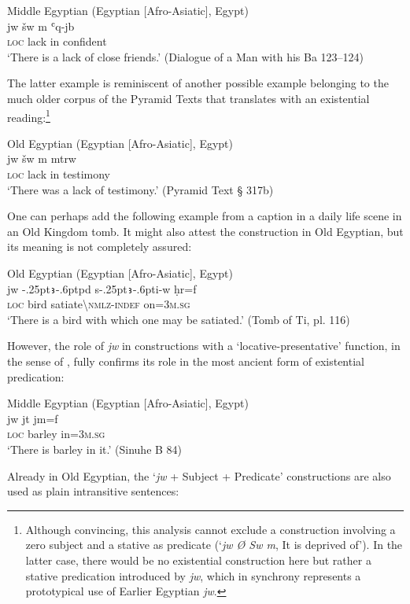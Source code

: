 \documentclass[output=paper]{langsci/langscibook}
\newcommand{\ꜥ}{ʿ}
\newcommand{\ꜣ}{\kern-.25pt\texttt{ꜣ}\kern-.6pt}
\begin{document}
\ea Middle Egyptian (Egyptian [Afro-Asiatic], Egypt) \label{ex:AE15}\\
	\gll jw šw m {\ꜥ}q-jb\\
	\textsc{loc} lack in confident\\
	\glt ‘There is a lack of close friends.’ (Dialogue of a Man with his Ba 123–124)
\z 

The latter example is reminiscent of another possible example belonging to the much older corpus of the Pyramid Texts that \citet[333]{Allen2017} translates with an existential reading:\footnote{Although convincing, this analysis cannot exclude a construction involving a zero subject and a stative as predicate (‘\textit{jw Ø Sw m}, It is deprived of’). In the latter case, there would be no existential construction here but rather a stative predication introduced by \textit{jw}, which in synchrony represents a prototypical use of Earlier Egyptian \textit{jw}.}

\ea Old Egyptian (Egyptian [Afro-Asiatic], Egypt) \label{ex:AE16}\\
	\gll jw šw m mtrw\\
	\textsc{loc} lack in testimony\\
	\glt ‘There was a lack of testimony.’ (Pyramid Text § 317b)
\z 

One can perhaps add the following example from a caption in a daily life scene in an Old Kingdom tomb. It might also attest the construction in Old Egyptian, but its meaning is not completely assured:

\ea Old Egyptian (Egyptian [Afro-Asiatic], Egypt) \label{ex:AE17}\\
	\gll jw {\ꜣ}pd s{\ꜣ}i-w ḥr=f\\
	\textsc{loc} bird satiate\textbackslash\textsc{nmlz-indef} on=\textsc{3m.sg}\\
	\glt ‘There is a bird with which one may be satiated.’ (Tomb of Ti, pl. 116)
\z 

However, the role of \textit{jw} in constructions with a ‘locative-presentative’ function, in the sense of \citet{Hengeveld1992}, fully confirms its role in the most ancient form of existential predication:

\ea Middle Egyptian (Egyptian [Afro-Asiatic], Egypt) \label{ex:AE18}\\
	\gll jw jt jm=f\\
	\textsc{loc} barley in=\textsc{3m.sg}\\
	\glt ‘There is barley in it.’ (Sinuhe B 84)
\z 

Already in Old Egyptian, the ‘\textit{jw} + Subject + Predicate’ constructions are also used as plain intransitive sentences: 
\end{document}

